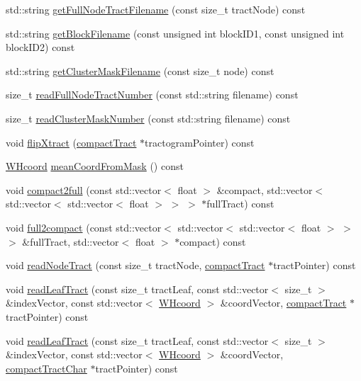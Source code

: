 \begin{DoxyCompactItemize}
\item 
std\-::string \hyperlink{classfileManager_af4f1020afb21f2a1c37b48cf8b694557}{get\-Full\-Node\-Tract\-Filename} (const size\-\_\-t tract\-Node) const 
\item 
std\-::string \hyperlink{classfileManager_a0f0c2649d0d3422185ec013324769791}{get\-Block\-Filename} (const unsigned int block\-I\-D1, const unsigned int block\-I\-D2) const 
\item 
std\-::string \hyperlink{classfileManager_a96bd86333f1b24dcb5b2110c9bcac38f}{get\-Cluster\-Mask\-Filename} (const size\-\_\-t node) const 
\item 
size\-\_\-t \hyperlink{classfileManager_aa15ca3b9edb5d2d3905ee7f5d627230a}{read\-Full\-Node\-Tract\-Number} (const std\-::string filename) const 
\item 
size\-\_\-t \hyperlink{classfileManager_a64d3bd1b3ef7192a4f7f02b3840f5fb0}{read\-Cluster\-Mask\-Number} (const std\-::string filename) const 
\item 
void \hyperlink{classfileManager_aaeba12c39f82137bcfd6841389df7b26}{flip\-Xtract} (\hyperlink{classcompactTract}{compact\-Tract} $\ast$tractogram\-Pointer) const 
\item 
\hyperlink{classWHcoord}{\-W\-Hcoord} \hyperlink{classfileManager_a3af89c1b2da86ca6185234cc9dd8e888}{mean\-Coord\-From\-Mask} () const 
\item 
void \hyperlink{classfileManager_aee236bd074126896cc5dc4e1d5c5a2ee}{compact2full} (const std\-::vector$<$ float $>$ \&compact, std\-::vector$<$ std\-::vector$<$ std\-::vector$<$ float $>$ $>$ $>$ $\ast$full\-Tract) const 
\item 
void \hyperlink{classfileManager_ab9acd7828868c65f81bad95d2aa3a755}{full2compact} (const std\-::vector$<$ std\-::vector$<$ std\-::vector$<$ float $>$ $>$ $>$ \&full\-Tract, std\-::vector$<$ float $>$ $\ast$compact) const 
\item 
void \hyperlink{classfileManager_a172ba174ac43ed256cf9aee840291a40}{read\-Node\-Tract} (const size\-\_\-t tract\-Node, \hyperlink{classcompactTract}{compact\-Tract} $\ast$tract\-Pointer) const 
\item 
void \hyperlink{classfileManager_a97e3a5cabee00b97bbe0be4b572f49bd}{read\-Leaf\-Tract} (const size\-\_\-t tract\-Leaf, const std\-::vector$<$ size\-\_\-t $>$ \&index\-Vector, const std\-::vector$<$ \hyperlink{classWHcoord}{\-W\-Hcoord} $>$ \&coord\-Vector, \hyperlink{classcompactTract}{compact\-Tract} $\ast$tract\-Pointer) const 
\item 
void \hyperlink{classfileManager_aaf4d7b1f071b2b1a4a1f0b1b3131bb78}{read\-Leaf\-Tract} (const size\-\_\-t tract\-Leaf, const std\-::vector$<$ size\-\_\-t $>$ \&index\-Vector, const std\-::vector$<$ \hyperlink{classWHcoord}{\-W\-Hcoord} $>$ \&coord\-Vector, \hyperlink{classcompactTractChar}{compact\-Tract\-Char} $\ast$tract\-Pointer) const 

\end{DoxyCompactItemize}

